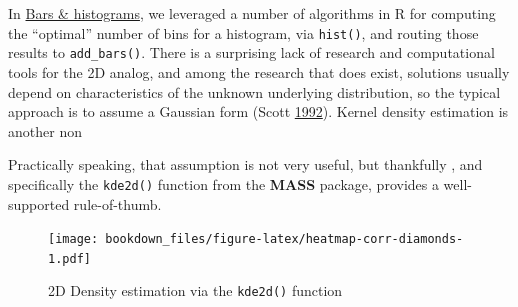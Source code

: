 \documentclass[12pt,]{isuthesis}
\newenvironment{Shaded}{\begin{snugshade}}{\end{snugshade}}
\newcommand{\KeywordTok}[1]{\textcolor[rgb]{0.13,0.29,0.53}{\textbf{{#1}}}}
\newcommand{\DataTypeTok}[1]{\textcolor[rgb]{0.13,0.29,0.53}{{#1}}}
\newcommand{\DecValTok}[1]{\textcolor[rgb]{0.00,0.00,0.81}{{#1}}}
\newcommand{\StringTok}[1]{\textcolor[rgb]{0.31,0.60,0.02}{{#1}}}
\newcommand{\NormalTok}[1]{{#1}}
\begin{document}
In \protect\hyperlink{bars-histograms}{Bars \& histograms}, we leveraged
a number of algorithms in R for computing the ``optimal'' number of bins
for a histogram, via \texttt{hist()}, and routing those results to
\texttt{add\_bars()}. There is a surprising lack of research and
computational tools for the 2D analog, and among the research that does
exist, solutions usually depend on characteristics of the unknown
underlying distribution, so the typical approach is to assume a Gaussian
form (Scott \protect\hyperlink{ref-mde}{1992}). Kernel density
estimation is another non

Practically speaking, that assumption is not very useful, but thankfully
, and specifically the \texttt{kde2d()} function from the \textbf{MASS}
package, provides a well-supported rule-of-thumb.

\begin{Shaded}
\end{Shaded}

\begin{figure}[htbp]
\centering
\texttt{[image: bookdown\_files/figure-latex/heatmap-corr-diamonds-1.pdf]}
\caption{\label{fig:heatmap-corr-diamonds}2D Density estimation via the
\texttt{kde2d()} function}
\end{figure}
\end{document}
